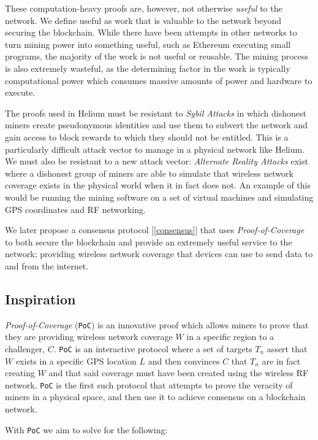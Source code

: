 \documentclass[letterpaper,11pt]{article}
\begin{document}
These computation-heavy proofs are, however, not otherwise \emph{useful} to the network. We define useful as work that is valuable to the network beyond securing the blockchain. While there have been attempts in other networks to turn mining power into something useful, such as Ethereum executing small programs, the majority of the work is not useful or reusable. The mining process is also extremely wasteful, as the determining factor in the work is typically computational power which consumes massive amounts of power and hardware to execute.

The proofs used in Helium must be resistant to \emph{Sybil Attacks} in which dishonest miners create pseudonymous identities and use them to subvert the network and gain access to block rewards to which they should not be entitled. This is a particularly difficult attack vector to manage in a physical network like Helium. We must also be resistant to a new attack vector: \emph{Alternate Reality Attacks} exist where a dishonest group of miners are able to simulate that wireless network coverage exists in the physical world when it in fact does not. An example of this would be running the mining software on a set of virtual machines and simulating GPS coordinates and RF networking.

We later propose a consensus protocol [\ref{consensus}] that uses \emph{Proof-of-Coverage} to both secure the blockchain and provide an extremely useful service to the network; providing wireless network coverage that devices can use to send data to and from the internet.

\subsection{Inspiration}

\emph{Proof-of-Coverage} (\verb|PoC|) is an innovative proof which allows miners to prove that they are providing wireless network coverage $W$ in a specific region to a challenger, $C$. \verb|PoC| is an interactive protocol where a set of targets $T_n$ assert that $W$ exists in a specific GPS location $L$ and then convinces $C$ that $T_n$ are in fact creating $W$ and that said coverage must have been created using the wireless RF network. \verb|PoC| is the first such protocol that attempts to prove the veracity of miners in a physical space, and then use it to achieve consensus on a blockchain network.

With \verb|PoC| we aim to solve for the following:
\end{document}
